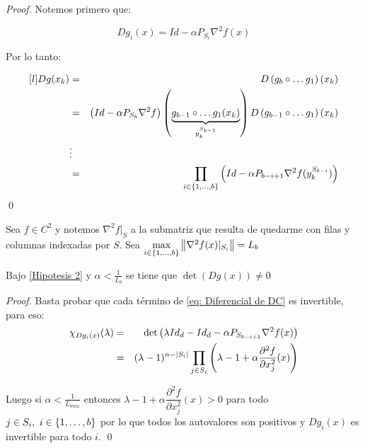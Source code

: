\begin{proof}
	Notemos primero que:
	
	\begin{equation*}
	Dg_{i}(x) = Id - \alpha P_{S_i} \nabla ^2 f(x)
	\end{equation*}
	
	Por lo tanto:
	
	\begin{equation*}
	\begin{aligned}[l]
	Dg(x_k) & = & D\parenthesis{g_b \circ \dots g_1}(x_k) \\
	& = & \parenthesis{Id - \alpha P_{S_b}\nabla^2f}\parenthesis{\underbrace{g_{b-1} \circ \dots g_{1}(x_k)}_{y_{k}^{S_{b-1}}}} D\parenthesis{g_{b-1} \circ \dots g_1}(x_k) \\
	& \vdots & \\
	& = & \Bigprod{i \in \sett{1, \dots, b}}{\parenthesis{Id - \alpha P_{b-i+1}\nabla ^2 f(y_{k}^{S_{b-i}})}}
	\end{aligned}
	\end{equation*}\qed
	
\end{proof}

\begin{remark}
	\label{Hipotesis 2}
	Sea $f \in C^2$ y notemos $\nabla^2 f \vert_S$ a la submatriz que resulta de quedarme con filas y columnas indexadas por $S$. Sea $\max\limits_{i \in \left\lbrace1, \dots, b\right\rbrace}{\left\lVert\nabla ^2 f(x) \vert_{S_i}\right\rVert} = L_b$
\end{remark}

\begin{proposition}
	\label{prop: DC es difeo local}
	Bajo \ref{Hipotesis 2} y $\alpha < \frac{1}{L_b}$ se tiene que $\det(Dg(x)) \neq 0$
\end{proposition}

\begin{proof}
	Basta probar que cada t\'ermino de \ref{eq: Diferencial de DC} es invertible, para eso:
	\begin{equation*}
	\begin{aligned}
	\chi_{Dg_i(x)}(\lambda) & = & \det\left(
			\lambda Id_d - Id_d - \alpha P_{S_{b-i+1}}\nabla ^2 f(x)
		\right) \\
		& = & (\lambda -1)^{n-\left\lvert S_i\right\rvert}\prod\limits_{j \in S_i}{\left(\lambda -1 + \alpha\dfrac{\partial^2 f}{\partial x_j^2}(x) \right)}
	\end{aligned}
	\end{equation*}
	
	Luego si $\alpha < \frac{1}{L_{max}}$ entonces $\lambda -1 + \alpha\dfrac{\partial^2 f}{\partial x_j^2}(x) > 0$ para todo $j \in S_i, \ i \in \left\lbrace1, \dots, b\right\rbrace$ por lo que todos los autovalores son positivos y $Dg_i(x)$ es invertible para todo $i$. \qed
	
\end{proof}


